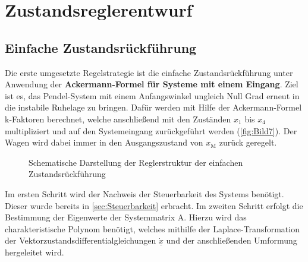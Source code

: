 \section{Zustandsreglerentwurf} \label{sec:Zustandsreglerentwurf}

\subsection{Einfache Zustandsrückführung} \label{sec:Ackermann-Formel}

Die erste umgesetzte Regelstrategie ist die einfache Zustandsrückführung unter Anwendung der \textbf{Ackermann-Formel für Systeme mit einem Eingang}. Ziel ist es, das Pendel-System mit einem Anfangswinkel ungleich Null Grad erneut in die instabile Ruhelage zu bringen. Dafür werden mit Hilfe der Ackermann-Formel k-Faktoren berechnet, welche anschließend mit den Zuständen $x_{\mathrm{1}}$ bis $x_{\mathrm{4}}$ multipliziert und auf den Systemeingang zurückgeführt werden (\autoref{fig:Bild7}). Der Wagen wird dabei immer in den Ausgangszustand von $x_{\mathrm{M}}$ zurück geregelt.

\begin{figure}[H]
    \centering
    \caption[Reglerstruktur einfache Zustandsrückführung]{Schematische Darstellung der Reglerstruktur der einfachen Zustandsrückführung}
    \label{fig:Bild7}
\end{figure}

Im ersten Schritt wird der Nachweis der Steuerbarkeit des Systems benötigt. Dieser wurde bereits in \autoref{sec:Steuerbarkeit} erbracht.
Im zweiten Schritt erfolgt die Bestimmung der Eigenwerte der Systemmatrix A. Hierzu wird das charakteristische Polynom benötigt, welches mithilfe der Laplace-Transformation der Vektorzustandsdifferentialgleichungen $\underline{\dot{x}}$ und der anschließenden Umformung hergeleitet wird.

